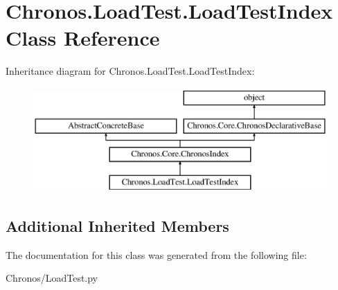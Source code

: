\hypertarget{classChronos_1_1LoadTest_1_1LoadTestIndex}{}\section{Chronos.\+Load\+Test.\+Load\+Test\+Index Class Reference}
\label{classChronos_1_1LoadTest_1_1LoadTestIndex}
Inheritance diagram for Chronos.\+Load\+Test.\+Load\+Test\+Index\+:\begin{figure}[H]
\begin{center}
\leavevmode
\includegraphics[height=4.000000cm]{classChronos_1_1LoadTest_1_1LoadTestIndex}
\end{center}
\end{figure}
\subsection*{Additional Inherited Members}


The documentation for this class was generated from the following file\+:\begin{DoxyCompactItemize}
\item 
Chronos/Load\+Test.\+py\end{DoxyCompactItemize}
